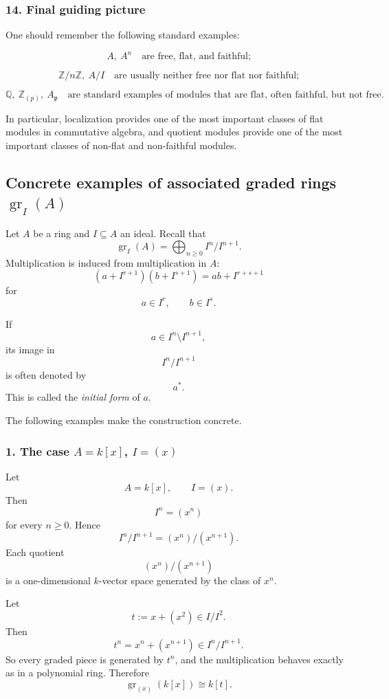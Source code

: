 \documentclass[12pt,a4paper]{article}
\theoremstyle{notespace}
\theoremstyle{definition}
\begin{document}
\subsubsection{14. Final guiding picture}

One should remember the following standard examples:

\[
A,\ A^n
\quad\text{are free, flat, and faithful;}
\]

\[
\mathbb Z/n\mathbb Z,\ A/I
\quad\text{are usually neither free nor flat nor faithful;}
\]

\[
\mathbb Q,\ \mathbb Z_{(p)},\ A_{\mathfrak p}
\quad\text{are standard examples of modules that are flat, often faithful, but not free.}
\]

In particular, localization provides one of the most important classes of flat modules in commutative algebra, and quotient modules provide one of the most important classes of non-flat and non-faithful modules.

\subsection{Concrete examples of associated graded rings \(\operatorname{gr}_I(A)\)}

Let \(A\) be a ring and \(I\subseteq A\) an ideal. Recall that
\[
\operatorname{gr}_I(A)
=
\bigoplus_{n\ge 0} I^n/I^{n+1}.
\]
Multiplication is induced from multiplication in \(A\):
\[
(a+I^{r+1})(b+I^{s+1})=ab+I^{r+s+1}
\]
for
\[
a\in I^r,\qquad b\in I^s.
\]

If
\[
a\in I^n\setminus I^{n+1},
\]
its image in
\[
I^n/I^{n+1}
\]
is often denoted by
\[
a^*.
\]
This is called the \emph{initial form} of \(a\).

The following examples make the construction concrete.

\subsubsection{1. The case \(A=k[x]\), \(I=(x)\)}

Let
\[
A=k[x],
\qquad
I=(x).
\]
Then
\[
I^n=(x^n)
\]
for every \(n\ge 0\). Hence
\[
I^n/I^{n+1}=(x^n)/(x^{n+1}).
\]
Each quotient
\[
(x^n)/(x^{n+1})
\]
is a one-dimensional \(k\)-vector space generated by the class of \(x^n\).

Let
\[
t:=x+(x^2)\in I/I^2.
\]
Then
\[
t^n=x^n+(x^{n+1})\in I^n/I^{n+1}.
\]
So every graded piece is generated by \(t^n\), and the multiplication behaves exactly as in a polynomial ring. Therefore
\[
\operatorname{gr}_{(x)}(k[x])\cong k[t].
\]
\end{document}
